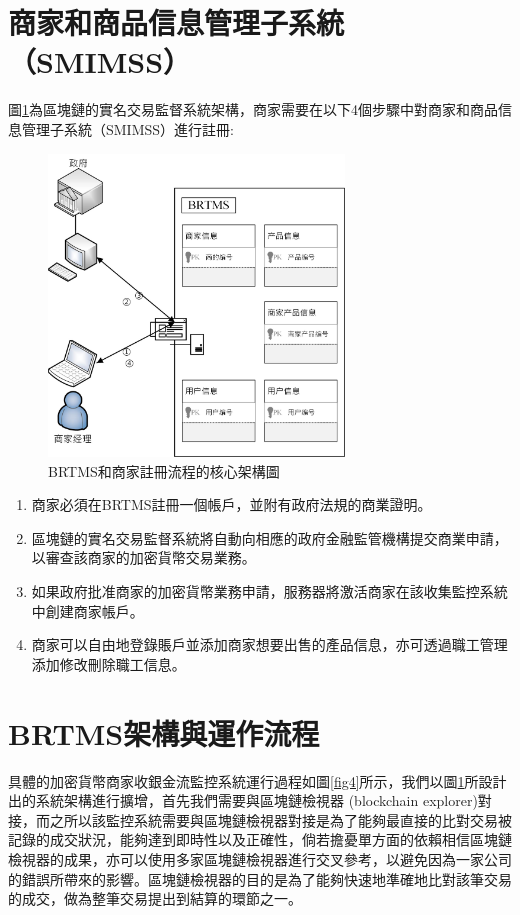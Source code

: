 	\section{商家和商品信息管理子系統（SMIMSS）}
	圖\ref{fig3}為區塊鏈的實名交易監督系統架構，商家需要在以下4個步驟中對商家和商品信息管理子系統（SMIMSS）進行註冊:

	\begin{figure}[htbp]
		\centering
		\includegraphics[width = 0.7\textwidth]{fig3.jpg}
		\caption{BRTMS和商家註冊流程的核心架構圖}\label{fig3}
	\end{figure}

	\begin{enumerate}
		\item 商家必須在BRTMS註冊一個帳戶，並附有政府法規的商業證明。
		\item 區塊鏈的實名交易監督系統將自動向相應的政府金融監管機構提交商業申請，以審查該商家的加密貨幣交易業務。
		\item 如果政府批准商家的加密貨幣業務申請，服務器將激活商家在該收集監控系統中創建商家帳戶。
		\item 商家可以自由地登錄賬戶並添加商家想要出售的產品信息，亦可透過職工管理添加修改刪除職工信息。
	\end{enumerate}

\section{BRTMS架構與運作流程}
	具體的加密貨幣商家收銀金流監控系統運行過程如圖\ref{fig4}所示，我們以圖\ref{fig3}所設計出的系統架構進行擴增，首先我們需要與區塊鏈檢視器 (blockchain explorer)對接，而之所以該監控系統需要與區塊鏈檢視器對接是為了能夠最直接的比對交易被記錄的成交狀況，能夠達到即時性以及正確性，倘若擔憂單方面的依賴相信區塊鏈檢視器的成果，亦可以使用多家區塊鏈檢視器進行交叉參考，以避免因為一家公司的錯誤所帶來的影響。區塊鏈檢視器的目的是為了能夠快速地準確地比對該筆交易的成交，做為整筆交易提出到結算的環節之一。

